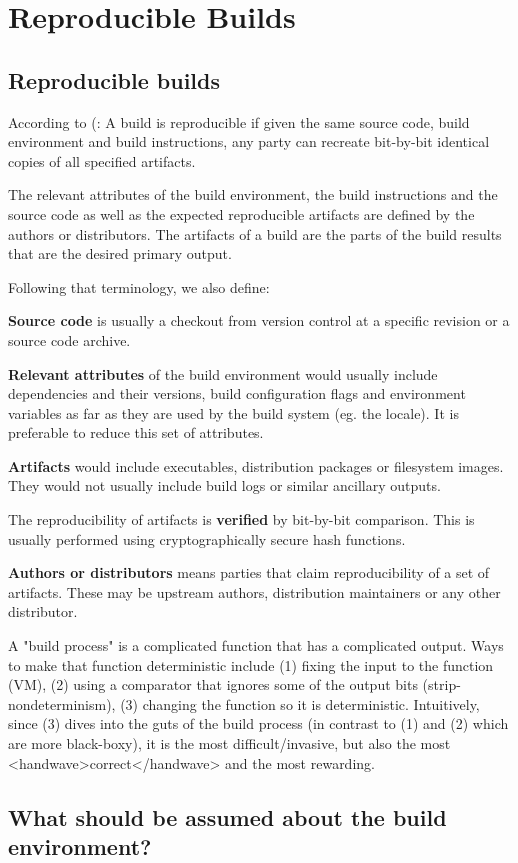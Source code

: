 \section{Reproducible Builds}
\label{SEC:reproducible-builds}


\subsection{Reproducible builds}

According to (:
A build is reproducible if given the same source code, build environment
and build instructions, any party can recreate bit-by-bit identical copies
of all specified artifacts.

The relevant attributes of the build environment, the build instructions
and the source code as well as the expected reproducible artifacts are
defined by the authors or distributors. The artifacts of a build are the
parts of the build results that are the desired primary output.


Following that terminology, we also define:

{\bf Source code} is usually a checkout from version control at a specific
revision or a source code archive.

{\bf Relevant attributes} of the build environment would usually include
dependencies and their versions, build configuration flags and environment
variables as far as they are used by the build system (eg. the locale). It
is preferable to reduce this set of attributes.

{\bf Artifacts} would include executables, distribution packages or filesystem
images. They would not usually include build logs or similar ancillary
outputs.

The reproducibility of artifacts is {\bf verified} by bit-by-bit comparison. 
This is usually performed using cryptographically secure hash functions.

{\bf Authors or distributors} means parties that claim reproducibility of a 
set of artifacts. These may be upstream authors, distribution maintainers or
any other distributor.

A "build process" is
a complicated function that has a complicated output.  Ways to make that
function deterministic include (1) fixing the input to the function
(VM), (2) using a comparator that ignores some of the output bits
(strip-nondeterminism), (3) changing the function so it is
deterministic.  Intuitively, since (3) dives into the guts of the build
process (in contrast to (1) and (2) which are more black-boxy), it is
the most difficult/invasive, but also the most <handwave>correct</handwave>
and the most rewarding.

\subsection{What should be assumed about the build environment?}


